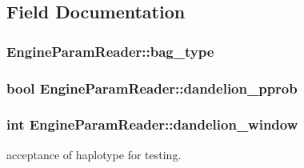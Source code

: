 \subsection{Field Documentation}
\hypertarget{classEngineParamReader_aa014c5a4566d1732eb0a14435330f379}{
\subsubsection[{bag\_\-type}]{ {\bf EngineParamReader::bag\_\-type}}}
\label{classEngineParamReader_aa014c5a4566d1732eb0a14435330f379}
\hypertarget{classEngineParamReader_ac352d87f0967d442b9d1e76757b7aab9}{
\subsubsection[{dandelion\_\-pprob}]{\setlength{\rightskip}{0pt plus 5cm}bool {\bf EngineParamReader::dandelion\_\-pprob}}}
\label{classEngineParamReader_ac352d87f0967d442b9d1e76757b7aab9}
\hypertarget{classEngineParamReader_a9a843b871678893b7c8968de092f4b48}{
\subsubsection[{dandelion\_\-window}]{\setlength{\rightskip}{0pt plus 5cm}int {\bf EngineParamReader::dandelion\_\-window}}}
\label{classEngineParamReader_a9a843b871678893b7c8968de092f4b48}


acceptance of haplotype for testing. 

